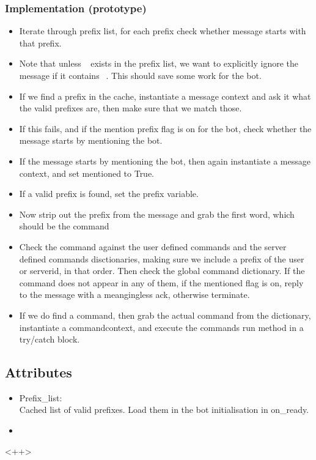 \documentclass[a4paper]{amsart}
\begin{document}
    \subsubsection{Implementation (prototype)}
        \begin{itemize}
            \item Iterate through prefix list, for each prefix check whether message starts with that prefix.
            \item Note that unless $~~$ exists in the prefix list, we want to explicitly ignore the message if it contains $~~$. This should save some work for the bot.
            \item If we find a prefix in the cache, instantiate a message context and ask it what the valid prefixes are, then make sure that we match those.
            \item If this fails, and if the mention prefix flag is on for the bot, check whether the message starts by mentioning the bot.
            \item If the message starts by mentioning the bot, then again instantiate a message context, and set mentioned to True.
            \item If a valid prefix is found, set the prefix variable.
            \item Now strip out the prefix from the message and grab the first word, which should be the command
            \item Check the command against the user defined commands and the server defined commands disctionaries, making sure we include a prefix of the user or serverid, in that order. Then check the global command dictionary. If the command does not appear in any of them, if the mentioned flag is on, reply to the message with a meangingless ack, otherwise terminate.
            \item If we do find a command, then grab the actual command from the dictionary, instantiate a commandcontext, and execute the commands run method in a try/catch block.
        \end{itemize}
\subsection{Attributes}
    \begin{itemize}
        \item Prefix\_list:\\
            Cached list of valid prefixes. Load them in the bot initialisation in on\_ready.
        \item 
    \end{itemize}<++>
\end{document}
